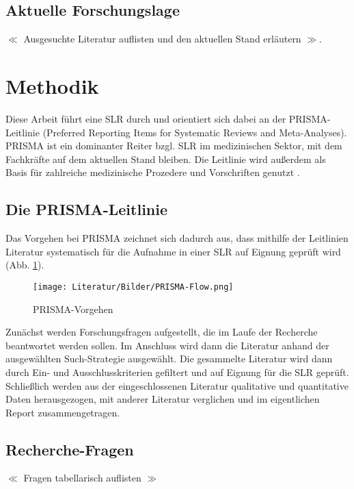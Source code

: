\documentclass{scrartcl}
\begin{document}
\subsection{Aktuelle Forschungslage}
$\ll$ Ausgesuchte Literatur auflisten und den aktuellen Stand erläutern $\gg$.

\section{Methodik}

Diese Arbeit führt eine SLR durch und orientiert sich
dabei an der PRISMA-Leitlinie (Preferred Reporting Items for Systematic Reviews and
Meta-Analyses).  PRISMA ist ein dominanter Reiter bzgl. SLR im medizinischen Sektor,
mit dem Fachkräfte auf dem aktuellen Stand bleiben.  Die Leitlinie wird außerdem als
Basis für zahlreiche medizinische Prozedere und Vorschriften genutzt \cite{prisma}.

\subsection{Die PRISMA-Leitlinie}
Das Vorgehen bei PRISMA zeichnet sich dadurch aus, dass mithilfe der Leitlinien
Literatur systematisch für die Aufnahme in einer SLR auf Eignung geprüft wird 
(Abb. \ref{fig:prisma1}).

\begin{figure}[h]
   \begin{center}
      \texttt{[image: Literatur/Bilder/PRISMA-Flow.png]}
   \end{center}
   \caption{PRISMA-Vorgehen \cite{ex1}}
   \label{fig:prisma1}
\end{figure}

Zunächst werden Forschungsfragen aufgestellt, die im Laufe der Recherche beantwortet
werden sollen. Im Anschluss wird dann die Literatur anhand der ausgewählten 
Such-Strategie ausgewählt. Die gesammelte Literatur wird dann durch Ein- und
Ausschlusskriterien gefiltert und auf Eignung für die SLR geprüft.
Schließlich werden aus der eingeschlossenen Literatur qualitative und quantitative
Daten herausgezogen, mit anderer Literatur verglichen und im eigentlichen
Report zusammengetragen.


\subsection{Recherche-Fragen}

$\ll$ Fragen tabellarisch auflisten $\gg$
\end{document}
